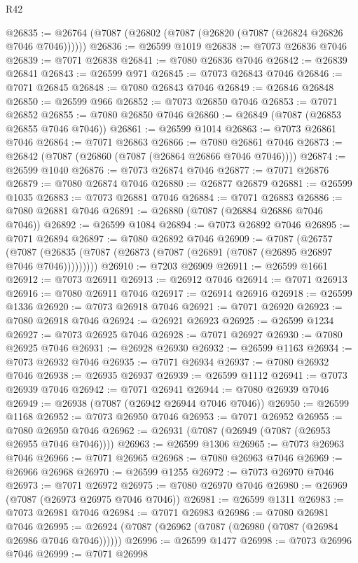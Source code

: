 \begin{lexlean}{R42}
\begin{coremodule}
{@26835 := @26764 (@7087 (@26802 (@7087 (@26820 (@7087 (@26824 @26826 @7046 @7046))))))
@26836 := @26599 @1019
@26838 := @7073 @26836 @7046
@26839 := @7071 @26838
@26841 := @7080 @26836 @7046
@26842 := @26839 @26841
@26843 := @26599 @971
@26845 := @7073 @26843 @7046
@26846 := @7071 @26845
@26848 := @7080 @26843 @7046
@26849 := @26846 @26848
@26850 := @26599 @966
@26852 := @7073 @26850 @7046
@26853 := @7071 @26852
@26855 := @7080 @26850 @7046
@26860 := @26849 (@7087 (@26853 @26855 @7046 @7046))
@26861 := @26599 @1014
@26863 := @7073 @26861 @7046
@26864 := @7071 @26863
@26866 := @7080 @26861 @7046
@26873 := @26842 (@7087 (@26860 (@7087 (@26864 @26866 @7046 @7046))))
@26874 := @26599 @1040
@26876 := @7073 @26874 @7046
@26877 := @7071 @26876
@26879 := @7080 @26874 @7046
@26880 := @26877 @26879
@26881 := @26599 @1035
@26883 := @7073 @26881 @7046
@26884 := @7071 @26883
@26886 := @7080 @26881 @7046
@26891 := @26880 (@7087 (@26884 @26886 @7046 @7046))
@26892 := @26599 @1084
@26894 := @7073 @26892 @7046
@26895 := @7071 @26894
@26897 := @7080 @26892 @7046
@26909 := @7087
    (@26757 (@7087 (@26835 (@7087 (@26873 (@7087 (@26891 (@7087 (@26895 @26897 @7046 @7046)))))))))
@26910 := @7203 @26909
@26911 := @26599 @1661
@26912 := @7073 @26911
@26913 := @26912 @7046
@26914 := @7071 @26913
@26916 := @7080 @26911 @7046
@26917 := @26914 @26916
@26918 := @26599 @1336
@26920 := @7073 @26918 @7046
@26921 := @7071 @26920
@26923 := @7080 @26918 @7046
@26924 := @26921 @26923
@26925 := @26599 @1234
@26927 := @7073 @26925 @7046
@26928 := @7071 @26927
@26930 := @7080 @26925 @7046
@26931 := @26928 @26930
@26932 := @26599 @1163
@26934 := @7073 @26932 @7046
@26935 := @7071 @26934
@26937 := @7080 @26932 @7046
@26938 := @26935 @26937
@26939 := @26599 @1112
@26941 := @7073 @26939 @7046
@26942 := @7071 @26941
@26944 := @7080 @26939 @7046
@26949 := @26938 (@7087 (@26942 @26944 @7046 @7046))
@26950 := @26599 @1168
@26952 := @7073 @26950 @7046
@26953 := @7071 @26952
@26955 := @7080 @26950 @7046
@26962 := @26931 (@7087 (@26949 (@7087 (@26953 @26955 @7046 @7046))))
@26963 := @26599 @1306
@26965 := @7073 @26963 @7046
@26966 := @7071 @26965
@26968 := @7080 @26963 @7046
@26969 := @26966 @26968
@26970 := @26599 @1255
@26972 := @7073 @26970 @7046
@26973 := @7071 @26972
@26975 := @7080 @26970 @7046
@26980 := @26969 (@7087 (@26973 @26975 @7046 @7046))
@26981 := @26599 @1311
@26983 := @7073 @26981 @7046
@26984 := @7071 @26983
@26986 := @7080 @26981 @7046
@26995 := @26924 (@7087 (@26962 (@7087 (@26980 (@7087 (@26984 @26986 @7046 @7046))))))
@26996 := @26599 @1477
@26998 := @7073 @26996 @7046
@26999 := @7071 @26998
}
\end{coremodule}
\end{lexlean}

